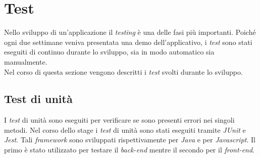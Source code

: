 \section{Test}
Nello sviluppo di un'applicazione il \textit{testing} è una delle fasi più importanti. Poiché ogni due settimane veniva presentata una demo dell'applicativo, i \textit{test} sono stati eseguiti di continuo durante lo sviluppo, sia in modo automatico sia manualmente. \\Nel corso di questa sezione vengono descritti i \textit{test} svolti durante lo sviluppo.

\subsection{Test di unità}
I \textit{test} di unità sono eseguiti per verificare se sono presenti errori nei singoli metodi. Nel corso dello stage i \textit{test} di unità sono stati eseguiti tramite \textit{JUnit} e \textit{Jest}. Tali \textit{framework} sono sviluppati rispettivamente per \textit{Java} e per \textit{Javascript}. Il primo è stato utilizzato per testare il \textit{back-end} mentre il secondo per il \textit{front-end}.


